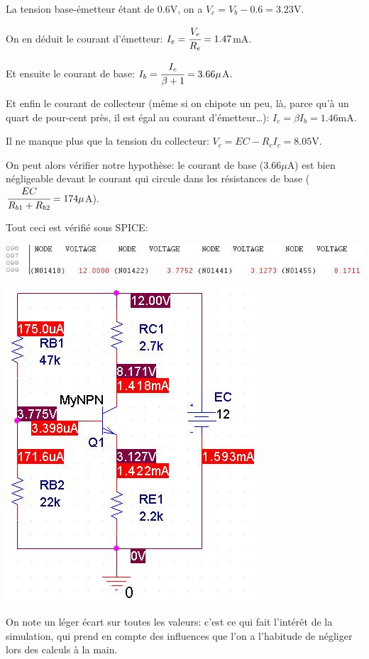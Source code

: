 \documentclass[10pt]{article}
\begin{document}
    La tension base-émetteur étant de $0.6$V, on a $V_e = V_b - 0.6 = 3.23$V.

    On en déduit le courant d’émetteur: $I_e = \cfrac{V_e}{R_e} = 1.47$mA.

    Et ensuite le courant de base: $I_b = \cfrac{I_e}{\beta + 1} = 3.66 \mu$A.

    Et enfin le courant de collecteur (même si on chipote un peu, là, parce qu’à
    un quart de pour-cent près, il est égal au courant d’émetteur…):
    $I_c = \beta I_b = 1.46$mA.

    Il ne manque plus que la tension du collecteur: $V_c = EC-R_c I_c = 8.05$V.

    On peut alors vérifier notre hypothèse: le courant de base ($3.66\mu$A)
    est bien négligeable devant le courant qui circule dans les résistances de
    base ($\cfrac{EC}{R_{b1}+R_{b2}} = 174\mu$A).

    Tout ceci est vérifié sous SPICE:

    \begin{center}
     \includegraphics{I-II-a_pt-equi_out.jpg}

     \includegraphics{I-II-a_pt-equi_circuit_et_valeurs.jpg}
    \end{center}

    On note un léger écart sur toutes les valeurs: c’est ce qui fait l’intérêt
    de la simulation, qui prend en compte des influences que l’on a l’habitude de
    négliger lors des calculs à la main.
\end{document}
